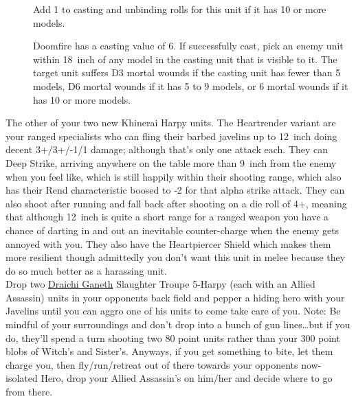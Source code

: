 \begin{description}
    \item [] Add 1 to casting and
        unbinding rolls for this unit if it has 10 or more models.
    \item [] Doomfire has a casting value of 6. If
        successfully cast, pick an enemy unit within 18~inch of any model in
        the casting unit that is visible to it. The target unit suffers D3
        mortal wounds if the casting unit has fewer than 5 models, D6 mortal
        wounds if it has 5 to 9 models, or 6 mortal wounds if it has 10 or more
        models.
\end{description}

The other of your two new Khinerai Harpy units. The Heartrender variant are
your ranged specialists who can fling their barbed javelins up to 12~inch doing
decent 3+/3+/-1/1 damage; although that's only one attack each.  
They can Deep Strike, arriving anywhere on the table more
than 9~inch from the enemy when you feel like, which is still happily within their
shooting range, which also has their Rend characteristic boosed to -2 for that
alpha strike attack.  
They can also shoot after running and fall back
after shooting on a die roll of 4+, meaning that although 12~inch is quite a short
range for a ranged weapon you have a chance of darting in and out an inevitable
counter-charge when the enemy gets annoyed with you. They also have the
Heartpiercer Shield which makes them more resilient though admittedly you don't
want this unit in melee because they do so much better as a harassing unit. \\

Drop two \hyperref[draichi-ganeth]{Draichi Ganeth} Slaughter Troupe 5-Harpy
    (each with an Allied Assassin) units in your opponents back field and
    pepper a hiding hero with your Javelins until you can aggro one of his
    units to come take care of you. Note: Be mindful of your surroundings and
    don't drop into a bunch of gun lines\ldots but if you do, they'll spend
    a turn shooting two 80 point units rather than your 300 point blobs of
    Witch's and Sister's.  Anyways, if you get something to bite, let them
    charge you, then fly/run/retreat out of there towards your opponents
    now-isolated Hero, drop your Allied Assassin's on him/her and decide where
    to go from there.\\


